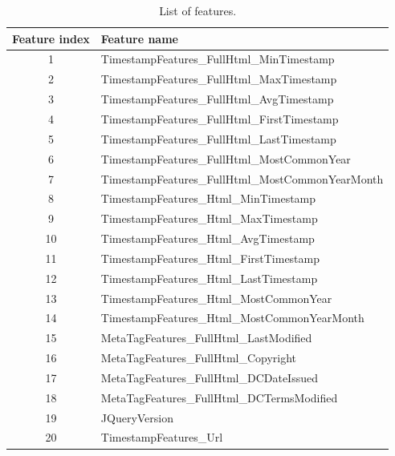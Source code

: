 \begin{table}[]
\centering
\caption{List of features.}
\label{tb:features}
\begin{tabular}{@{}cl@{}}
\toprule
Feature index & Feature name                                     \\ \midrule
1             & TimestampFeatures\_FullHtml\_MinTimestamp        \\
2             & TimestampFeatures\_FullHtml\_MaxTimestamp        \\
3             & TimestampFeatures\_FullHtml\_AvgTimestamp        \\
4             & TimestampFeatures\_FullHtml\_FirstTimestamp      \\
5             & TimestampFeatures\_FullHtml\_LastTimestamp       \\
6             & TimestampFeatures\_FullHtml\_MostCommonYear      \\
7             & TimestampFeatures\_FullHtml\_MostCommonYearMonth \\
8             & TimestampFeatures\_Html\_MinTimestamp            \\
9             & TimestampFeatures\_Html\_MaxTimestamp            \\
10            & TimestampFeatures\_Html\_AvgTimestamp            \\
11            & TimestampFeatures\_Html\_FirstTimestamp          \\
12            & TimestampFeatures\_Html\_LastTimestamp           \\
13            & TimestampFeatures\_Html\_MostCommonYear          \\
14            & TimestampFeatures\_Html\_MostCommonYearMonth     \\
15            & MetaTagFeatures\_FullHtml\_LastModified                   \\
16            & MetaTagFeatures\_FullHtml\_Copyright                      \\
17            & MetaTagFeatures\_FullHtml\_DCDateIssued                   \\
18            & MetaTagFeatures\_FullHtml\_DCTermsModified                \\
19            & JQueryVersion                                    \\
20            & TimestampFeatures\_Url                                     \\ \bottomrule
\end{tabular}
\end{table}

